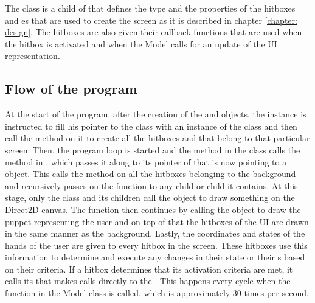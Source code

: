 The  class is a child of  that defines the type and the properties of the hitboxes and es that are used to create the screen as it is described in chapter \ref{chapter: design}. The hitboxes are also given their callback functions that are used when the hitbox is activated and when the Model calls for an update of the UI representation.


\subsection{Flow of the program}

At the start of the program, after the creation of the  and  objects, the  instance is instructed to fill his pointer to the  class with an instance of the  class and then call the method  on it to create all the hitboxes and  that belong to that particular screen. Then, the program loop is started and the  method in the  class calls the  method in , which passes it along to its pointer of   that is now pointing to a  object. This calls the  method on all the hitboxes belonging to the background and recursively passes on the  function to any  child or  child it contains. At this stage, only the  class and its children call the  object to draw something on the Direct2D canvas. The  function then continues by calling the  object to draw the puppet representing the user and on top of that the hitboxes of the UI are drawn in the same manner as the background. Lastly, the coordinates and states of the hands of the user are given to every hitbox in the screen. These hitboxes use this information to determine and execute any changes in their state or their s based on their criteria. If a hitbox determines that its activation criteria are met, it calls its  that makes calls directly to the . This happens every cycle when the  function in the Model class is called, which is approximately 30 times per second.\\

